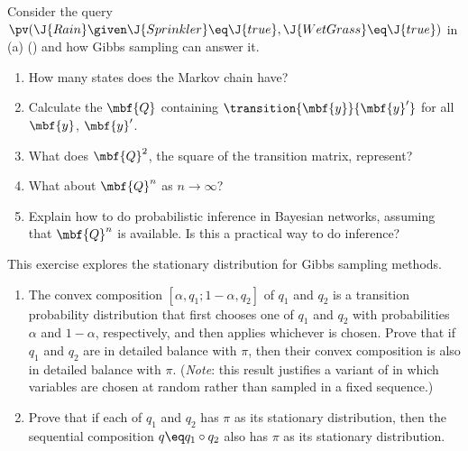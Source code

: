 \begin{exercise}
Consider the query \(\pv(\J{Rain}\given \J{Sprinkler}\eq
\J{true},\J{WetGrass}\eq \J{true})\) in (a) ()
and how Gibbs sampling can answer it.
\begin{enumerate}
\item How many states does the Markov chain have?
\item Calculate the 
\(\mbf{Q}\) containing \(\transition{\mbf{y}}{\mbf{y}'}\) for all \(\mbf{y}\),
\(\mbf{y}'\).
\item What does \(\mbf{Q}^2\), the square of the transition matrix, represent?
\item What about \(\mbf{Q}^n\) as \(n\to \infty\)?
\item Explain how to do probabilistic inference in Bayesian networks,
assuming that \(\mbf{Q}^n\) is available. Is this a practical way to do inference?
\end{enumerate}
\end{exercise} 

\begin{exercise}
This exercise explores the stationary distribution for Gibbs sampling methods.
\begin{enumerate}
\item The convex composition \([\alpha, q_1; 1-\alpha, q_2]\) of \(q_1\) and \(q_2\) is a transition probability distribution that first chooses one of \(q_1\) and \(q_2\) with probabilities \(\alpha\) and \(1-\alpha\), respectively, and then applies whichever is chosen.
Prove that if \(q_1\) and \(q_2\) are in detailed balance with \(\pi\),
then their convex composition is also in detailed balance with \(\pi\). ({\em Note}: this result justifies a variant of  in which variables are chosen at random rather than sampled in a fixed sequence.)
\item Prove that if each of \(q_1\) and \(q_2\) has \(\pi\) as its stationary distribution,
then the sequential composition \(q \eq q_1 \circ q_2\) also has \(\pi\) as its stationary distribution.
\end{enumerate}
\end{exercise} 

